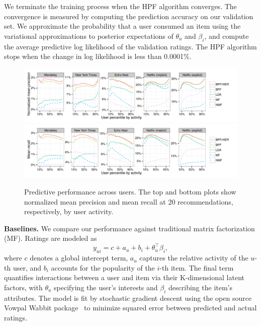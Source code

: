 We terminate the training process when the HPF algorithm
converges. The convergence is measured by computing the prediction
accuracy on our validation set. We approximate the probability that a
user consumed an item using the variational approximations to
posterior expectations of $\theta_u$ and $\beta_i$, and compute the
average predictive log likelihood of the validation ratings. The HPF
algorithm stops when the change in log likelihood is less than
0.0001\%.

\begin{figure}[t!]
\centering
\includegraphics[width=\textwidth]{figures/mean_precision_at_20_by_user_percentile.pdf}\\
\includegraphics[width=\textwidth]{figures/mean_recall_at_20_by_user_percentile.pdf}\\
\caption{Predictive performance across users. The top and bottom plots
  show normalized mean precision and mean recall at 20
  recommendations, respectively, by user activity.}
\label{fig:precision_recall_by_user_activity}
\end{figure}


{\bf Baselines.} We compare our performance against traditional matrix
factorization (MF). Ratings are modeled as
\begin{equation*}
  y_{ui} = c + a_u + b_i + \theta_u^\top \beta_i,
\end{equation*}
where $c$ denotes a global intercept term, $a_u$ captures the relative
activity of the $u$-th user, and $b_i$ accounts for the popularity of
the $i$-th item. The final term quantifies interactions between a user
and item via their K-dimensional latent factors, with $\theta_u$ specifying
the user's interests and $\beta_i$ describing the item's attributes. The
model is fit by stochastic gradient descent using the open source
Vowpal Wabbit package~\cite{Weinberger:2009} to minimize squared error
between predicted and actual ratings.

